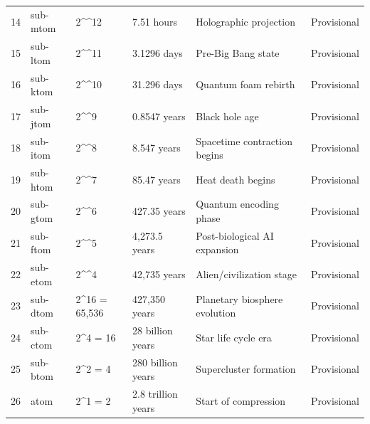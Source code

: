 \documentclass[11pt,letterpaper]{article}
\begin{document}
\begin{longtable}{L{0.36in}L{0.72in}L{1.12in}L{1.18in}L{2.12in}L{0.72in}}
14 & sub-mtom & 2\textasciicircum{}\textasciicircum{}12 & 7.51 hours & Holographic projection & Provisional \\
15 & sub-ltom & 2\textasciicircum{}\textasciicircum{}11 & 3.1296 days & Pre-Big Bang state & Provisional \\
16 & sub-ktom & 2\textasciicircum{}\textasciicircum{}10 & 31.296 days & Quantum foam rebirth & Provisional \\
17 & sub-jtom & 2\textasciicircum{}\textasciicircum{}9 & 0.8547 years & Black hole age & Provisional \\
18 & sub-itom & 2\textasciicircum{}\textasciicircum{}8 & 8.547 years & Spacetime contraction begins & Provisional \\
19 & sub-htom & 2\textasciicircum{}\textasciicircum{}7 & 85.47 years & Heat death begins & Provisional \\
20 & sub-gtom & 2\textasciicircum{}\textasciicircum{}6 & 427.35 years & Quantum encoding phase & Provisional \\
21 & sub-ftom & 2\textasciicircum{}\textasciicircum{}5 & 4,273.5 years & Post-biological AI expansion & Provisional \\
22 & sub-etom & 2\textasciicircum{}\textasciicircum{}4 & 42,735 years & Alien/civilization stage & Provisional \\
23 & sub-dtom & 2\textasciicircum{}16 = 65,536 & 427,350 years & Planetary biosphere evolution & Provisional \\
24 & sub-ctom & 2\textasciicircum{}4 = 16 & 28 billion years & Star life cycle era & Provisional \\
25 & sub-btom & 2\textasciicircum{}2 = 4 & 280 billion years & Supercluster formation & Provisional \\
26 & atom & 2\textasciicircum{}1 = 2 & 2.8 trillion years & Start of compression & Provisional \\
\bottomrule
\end{longtable}
\normalsize
\end{document}
